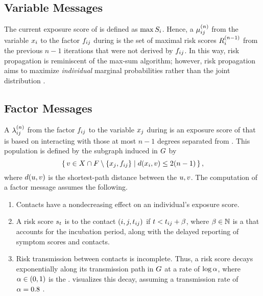 \subsection{Variable Messages}

The current exposure score of  is defined as $\max S_i$. Hence, a  $\mu_{ij}^{(n)}$ from the variable \vertexName $\vVariable[i]$ to the factor \vertexName $\vFactor[ij]$ during  is the set of maximal risk scores $R_{i}^{(n - 1)}$ from the previous $n - 1$ iterations that were not derived by $\vFactor[ij]$. In this way, risk propagation is reminiscent of the max-sum algorithm; however, risk propagation aims to maximize \emph{individual} marginal probabilities rather than the joint distribution \cite[pp. 411--415]{Bishop2006}.

\subsection{Factor Messages}

A  $\lambda_{ij}^{(n)}$ from the factor \vertexName $\vFactor[ij]$ to the variable \vertexName $\vVariable[j]$ during  is an exposure score of  that is based on interacting with those at most $n - 1$ degrees separated from . This population is defined by the subgraph induced in $G$ by
\begin{equation*}
  \setBuilder{\vVertex \in \vVariables \cap \vFactors \setminus \{\vVariable[j], \vFactor[ij]\}}{\dist(\vVariable[i], \vVertex) \leq 2(n - 1)},
\end{equation*}
where $d(u, v)$ is the shortest-path distance between the \verticesName $u, v$. The computation of a factor message assumes the following.
\begin{enumerate}
  \item Contacts have a nondecreasing effect on an individual's exposure score.
  \item A risk score $s_t$ is  to the contact $(i, j, t_{ij})$ if $t < t_{ij} +\beta$, where $\beta \in \mathbb{N}$ is a  that accounts for the incubation period, along with the delayed reporting of symptom scores and contacts.
  \item Risk transmission between contacts is incomplete. Thus, a risk score decays exponentially along its transmission path in $G$ at a rate of $\log \alpha$, where $\alpha \in (0, 1)$ is the .  visualizes this decay, assuming a transmission rate of $\alpha = 0.8$ \citep{Hamner2020}.\end{enumerate}

